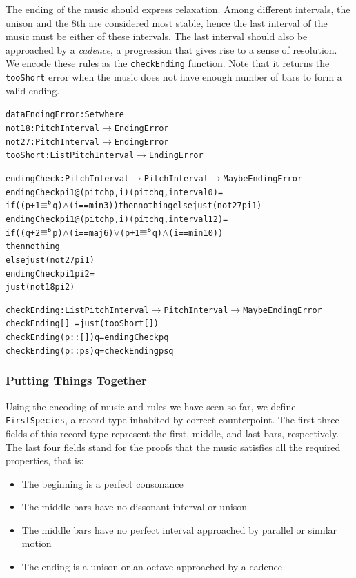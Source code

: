The ending of the music should express relaxation.
Among different intervals, the unison and the 8th are considered
most stable, hence the last interval of the music must be either of
these intervals.
The last interval should also be approached by a \emph{cadence},
a progression that gives rise to a sense of resolution.
We encode these rules as the \texttt{checkEnding} function.
Note that it returns the \texttt{tooShort} error when the music does
not have enough number of bars to form a valid ending.

\begin{alltt}
data EndingError : Set where
  not18    : PitchInterval \(\rightarrow\) EndingError
  not27    : PitchInterval \(\rightarrow\) EndingError
  tooShort : List PitchInterval \(\rightarrow\) EndingError

endingCheck : PitchInterval \(\rightarrow\) PitchInterval \(\rightarrow\) Maybe EndingError
endingCheck pi1@(pitch p , i) (pitch q , interval 0)  = 
  if ((p + 1 \(\equiv\sp{\mathtt{b}}\) q) \(\wedge\) (i == min3)) then nothing else just (not27 pi1)
endingCheck pi1@(pitch p , i) (pitch q , interval 12) =
  if ((q + 2 \(\equiv\sp{\mathtt{b}}\) p) \(\wedge\) (i == maj6) \(\vee\) (p + 1 \(\equiv\sp{\mathtt{b}}\) q) \(\wedge\) (i == min10))
  then nothing
  else just (not27 pi1)
endingCheck pi1               pi2                     =
  just (not18 pi2)

checkEnding : List PitchInterval \(\rightarrow\) PitchInterval \(\rightarrow\) Maybe EndingError
checkEnding []        \_ = just (tooShort [])
checkEnding (p :: []) q = endingCheck p q
checkEnding (p :: ps) q = checkEnding ps q
\end{alltt}

\subsubsection{Putting Things Together}

Using the encoding of music and rules we have seen so far, we define
\texttt{FirstSpecies}, a record type inhabited by correct counterpoint.
The first three fields of this record type represent the first, middle,
and last bars, respectively.
The last four fields stand for the proofs that the music satisfies all
the required properties, that is:

\begin{itemize}
  \item The beginning is a perfect consonance
  \item The middle bars have no dissonant interval or unison
  \item The middle bars have no perfect interval approached by
    parallel or similar motion
  \item The ending is a unison or an octave approached by a cadence
\end{itemize}

